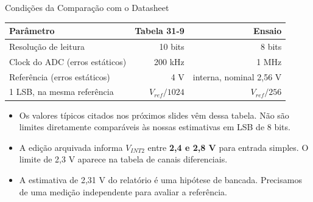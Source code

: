\begin{frame}{Condições da Comparação com o Datasheet}
\small
\begin{tabular}{lrr}
\hline
\textbf{Parâmetro} & \textbf{Tabela 31-9} & \textbf{Ensaio}\\\hline
Resolução de leitura & 10 bits & 8 bits\\
Clock do ADC (erros estáticos) & 200 kHz & 1 MHz\\
Referência (erros estáticos) & 4 V & interna, nominal 2,56 V\\
1 LSB, na mesma referência & $V_{ref}/1024$ & $V_{ref}/256$\\\hline
\end{tabular}
\begin{itemize}
\item Os valores típicos citados nos próximos slides vêm dessa tabela. Não são limites diretamente comparáveis às nossas estimativas em LSB de 8 bits.
\item A edição arquivada informa $V_{INT2}$ entre \textbf{2,4 e 2,8 V} para entrada simples. O limite de 2,3 V aparece na tabela de canais diferenciais.
\item A estimativa de 2,31 V do relatório é uma hipótese de bancada. Precisamos de uma medição independente para avaliar a referência.
\end{itemize}
\end{frame}
